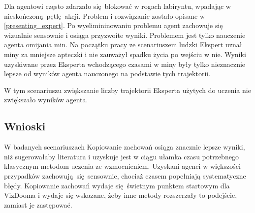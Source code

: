 Dla  agentowi często zdarzało się blokować w rogach labiryntu, wpadając w nieskończoną pętlę akcji. Problem i rozwiązanie zostało opisane w \ref{presenting_expert}. Po wyelimininowaniu problemu agent zachowuje się wizualnie sensownie i osiąga przyzwoite wyniki. Problemem jest tylko nauczenie agenta omijania min. Na początku pracy ze scenariuszem ludzki Ekspert uznał miny za mniejsze apteczki i nie zauważył spadku życia po wejściu w nie. Wyniki uzyskiwane przez Eksperta wchodzącego czasami w miny były tylko nieznacznie lepsze od wyników agenta nauczonego na podstawie tych trajektorii.

W tym scenariuszu zwiększanie liczby trajektorii Eksperta użytych do uczenia nie zwiększało wyników agenta. 

\subsection{Wnioski}
W badanych scenariuszach Kopiowanie zachowań osiąga znacznie lepsze wyniki, niż sugerowałaby literatura i uzyskuje jest w ciągu ułamka czasu potrzebnego klasycznym metodom uczenia ze wzmocnieniem. Uzyskani agenci w większości przypadków zachowują się sensownie, chociaż czasem popełniają systematyczne błędy. Kopiowanie zachowań wydaje się świetnym punktem startowym dla VizDooma i wydaje się wskazane, żeby inne metody rozszerzały to podejście, zamiast je zastępować.
